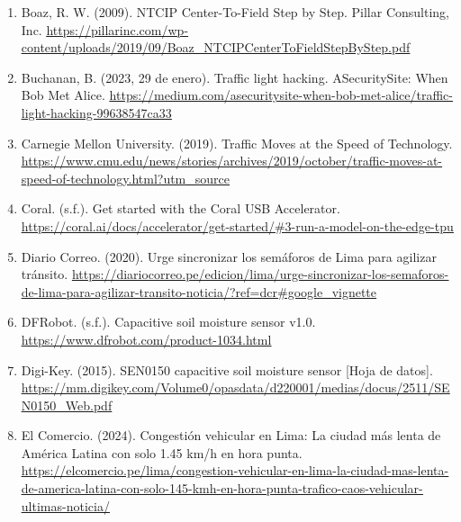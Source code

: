 \documentclass[12pt,a4paper,oneside]{report}
\providecommand{\ul}[1]{\underline{#1}}
\begin{document}
\begin{enumerate}
\item
  Boaz, R. W. (2009). NTCIP Center-To-Field Step by Step. Pillar Consulting, Inc. \href{https://pillarinc.com/wp-content/uploads/2019/09/Boaz_NTCIPCenterToFieldStepByStep.pdf}{\ul{https://pillarinc.com/wp-content/uploads/2019/09/Boaz\_NTCIPCenterToFieldStepByStep.pdf}}
\item
  Buchanan, B. (2023, 29 de enero). Traffic light hacking. ASecuritySite: When Bob Met Alice. \href{https://medium.com/asecuritysite-when-bob-met-alice/traffic-light-hacking-99638547ca33}{\ul{https://medium.com/asecuritysite-when-bob-met-alice/traffic-light-hacking-99638547ca33}}
\item
  Carnegie Mellon University. (2019). Traffic Moves at the Speed of Technology. \href{https://www.cmu.edu/news/stories/archives/2019/october/traffic-moves-at-speed-of-technology.html?utm_source}{\ul{https://www.cmu.edu/news/stories/archives/2019/october/traffic-moves-at-speed-of-technology.html?utm\_source}}
\item
  Coral. (s.f.). Get started with the Coral USB Accelerator. \href{https://coral.ai/docs/accelerator/get-started/\#3-run-a-model-on-the-edge-tpu}{\ul{https://coral.ai/docs/accelerator/get-started/\#3-run-a-model-on-the-edge-tpu}}
\item
  Diario Correo. (2020). Urge sincronizar los semáforos de Lima para agilizar tránsito. \href{https://diariocorreo.pe/edicion/lima/urge-sincronizar-los-semaforos-de-lima-para-agilizar-transito-noticia/?ref=dcr\#google_vignette}{\ul{https://diariocorreo.pe/edicion/lima/urge-sincronizar-los-semaforos-de-lima-para-agilizar-transito-noticia/?ref=dcr\#google\_vignette}}
\item
  DFRobot. (s.f.). Capacitive soil moisture sensor v1.0. \href{https://www.dfrobot.com/product-1034.html}{\ul{https://www.dfrobot.com/product-1034.html}}
\item
  Digi-Key. (2015). SEN0150 capacitive soil moisture sensor {[}Hoja de datos{]}. \href{https://mm.digikey.com/Volume0/opasdata/d220001/medias/docus/2511/SEN0150_Web.pdf}{\ul{https://mm.digikey.com/Volume0/opasdata/d220001/medias/docus/2511/SEN0150\_Web.pdf}}
\item
  El Comercio. (2024). Congestión vehicular en Lima: La ciudad más lenta de América Latina con solo 1.45 km/h en hora punta. \href{https://elcomercio.pe/lima/congestion-vehicular-en-lima-la-ciudad-mas-lenta-de-america-latina-con-solo-145-kmh-en-hora-punta-trafico-caos-vehicular-ultimas-noticia/}{\ul{https://elcomercio.pe/lima/congestion-vehicular-en-lima-la-ciudad-mas-lenta-de-america-latina-con-solo-145-kmh-en-hora-punta-trafico-caos-vehicular-ultimas-noticia/}}

\end{enumerate}
\end{document}
